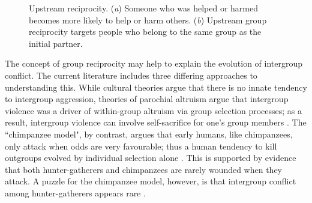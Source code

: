 \documentclass[12pt,a4paper]{article}\usepackage[]{graphicx}\usepackage[]{color}
\begin{document}
\begin{figure}
\begin{center}
\begin{subfigure}[b]{0.4\textwidth}
            \caption{}\label{group}
        \end{subfigure}
        \caption{Upstream reciprocity. (\textit{a}) Someone who was helped or harmed becomes more likely to help or harm others. (\textit{b})
    Upstream group reciprocity targets people who belong to
    the same group as the initial partner.}
        \label{fig:illustration}
	\end{center}
\end{figure}

The concept of group reciprocity may help to explain the evolution of intergroup conflict. The current literature 
includes three differing approaches to understanding this. While cultural theories argue that there is no innate tendency to 
intergroup aggression, theories of parochial altruism argue that intergroup violence was a driver of within-group 
altruism via group selection processes; as a result, intergroup violence can involve self-sacrifice for one's group
members \citep{choi2007coevolution,bowles2009did}. The ``chimpanzee model", by contrast, argues that early humans, like
chimpanzees, only attack when odds are very favourable; thus a human tendency to kill outgroups evolved by individual
selection alone \citep{wrangham2012intergroup}. This is supported by evidence that both 
hunter-gatherers and chimpanzees are rarely wounded when they attack. A puzzle for the chimpanzee model, however, is 
that intergroup conflict among hunter-gatherers appears rare \citep{fry2013lethal}. 
\end{document}
